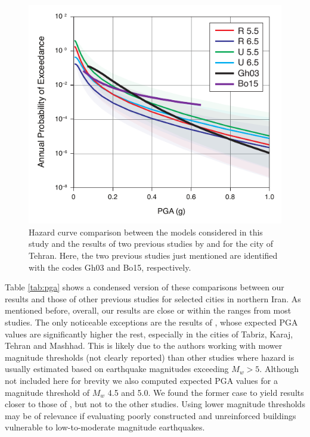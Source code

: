 \begin{figure}[t]
    \centering
    \includegraphics[width=\columnwidth]{figures/pdf/figure-13} 
    \caption{Hazard curve comparison between the models considered in this study and the results of two previous studies by \citet{Ghodrati2003} and \citet{Boostan2015} for the city of Tehran. Here, the two previous studies just mentioned are identified with the codes Gh03 and Bo15, respectively.}
    \label{fig:tehran}
\end{figure}

Table \ref{tab:pga} shows a condensed version of these comparisons between our results and those of other previous studies for selected cities in northern Iran. As mentioned before, overall, our results are close or within the ranges from most studies. The only noticeable exceptions are the results of \citet{Golara2014}, whose expected PGA values are significantly higher the rest, especially in the cities of Tabriz, Karaj, Tehran and Mashhad. This is likely due to the authors working with mower magnitude thresholds (not clearly reported) than other studies where hazard is usually estimated based on earthquake magnitudes exceeding $M_w > 5$. Although not included here for brevity we also computed expected PGA values for a magnitude threshold of $M_w$ 4.5 and 5.0. We found the former case to yield results closer to those of \citet{Golara2014}, but not to the other studies. Using lower magnitude thresholds may be of relevance if evaluating poorly constructed and unreinforced buildings vulnerable to low-to-moderate magnitude earthquakes.

